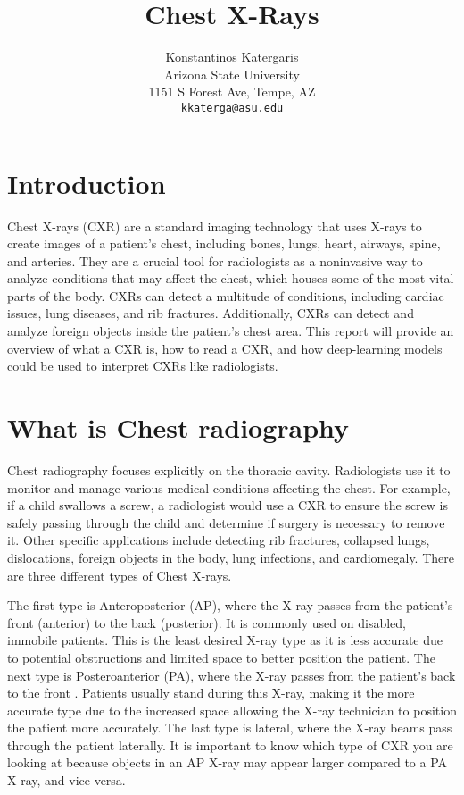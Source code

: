 \documentclass[10pt,twocolumn,letterpaper]{article}
\begin{document}
\title{Chest X-Rays}


\author{Konstantinos Katergaris\\
Arizona State University\\
1151 S Forest Ave, Tempe, AZ\\
{\tt\small kkaterga@asu.edu}}

\maketitle



\section{Introduction}
Chest X-rays (CXR) are a standard imaging technology that uses X-rays to create images of a patient’s chest, including bones, lungs, heart, airways, spine, and arteries. They are a crucial tool for radiologists as a noninvasive way to analyze conditions that may affect the chest, which houses some of the most vital parts of the body. CXRs can detect a multitude of conditions, including cardiac issues, lung diseases, and rib fractures. Additionally, CXRs can detect and analyze foreign objects inside the patient's chest area. This report will provide an overview of what a CXR is, how to read a CXR, and how deep-learning models could be used to interpret CXRs like radiologists.

\section{What is Chest radiography}
Chest radiography focuses explicitly on the thoracic cavity. Radiologists use it to monitor and manage various medical conditions affecting the chest. For example, if a child swallows a screw, a radiologist would use a CXR to ensure the screw is safely passing through the child and determine if surgery is necessary to remove it. Other specific applications include detecting rib fractures, collapsed lungs, dislocations, foreign objects in the body, lung infections, and cardiomegaly. There are three different types of Chest X-rays.

The first type is Anteroposterior (AP), where the X-ray passes from the patient's front (anterior) to the back (posterior). It is commonly used on disabled, immobile patients. This is the least desired X-ray type as it is less accurate due to potential obstructions and limited space to better position the patient. The next type is Posteroanterior (PA), where the X-ray passes from the patient's back to the front . Patients usually stand during this X-ray, making it the more accurate type due to the increased space allowing the X-ray technician to position the patient more accurately. The last type is lateral, where the X-ray beams pass through the patient laterally. It is important to know which type of CXR you are looking at because objects in an AP X-ray may appear larger compared to a PA X-ray, and vice versa.
\end{document}
